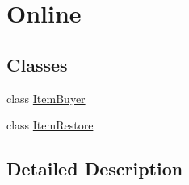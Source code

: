 \hypertarget{group__gr___online}{}\section{Online}
\label{group__gr___online}
\subsection*{Classes}
\begin{DoxyCompactItemize}
\item 
class \hyperlink{class_item_buyer}{Item\+Buyer}
\item 
class \hyperlink{class_item_restore}{Item\+Restore}
\end{DoxyCompactItemize}


\subsection{Detailed Description}
